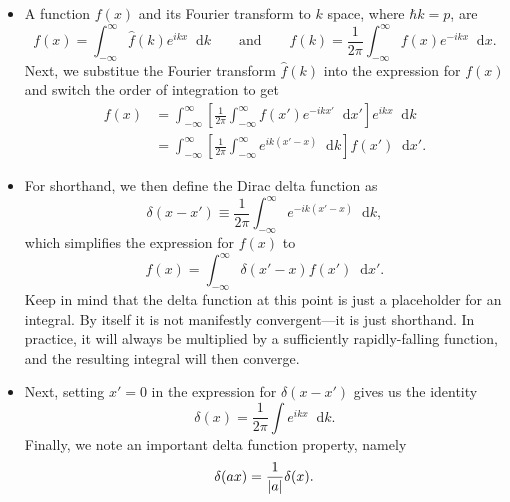 \documentclass[11pt, a4paper]{article}
\newcommand{\diff}{\mathop{}\!\mathrm{d}} %
\newcommand{\F}[1]{\widehat{#1}} %
\begin{document}
\begin{itemize}
    \item A function $ f(x) $ and its Fourier transform to $ k $ space, where $ \hbar k = p $, are
    \begin{equation*}
        f(x) = \int_{-\infty}^{\infty} \F{f}(k) e^{ikx} \diff k \qquad \text{and} \qquad  \F{f}(k) = \frac{1}{2\pi} \int_{-\infty}^{\infty} f(x) e^{-i k x} \diff x.
    \end{equation*}
    Next, we substitue the Fourier transform $ \F{f}(k) $ into the expression for $ f(x) $ and switch the order of integration to get
    \begin{align*}
        f(x) &= \int_{-\infty}^{\infty} \left[ \frac{1}{2\pi} \int_{-\infty}^{\infty} f(x') e^{-ikx'} \diff x' \right] e^{ikx}\diff k \\
        & = \int_{-\infty}^{\infty} \left[ \frac{1}{2\pi} \int_{-\infty}^{\infty} e^{ik(x' - x)}\diff k \right] f(x')\diff x'.
    \end{align*}

    \item For shorthand, we then define the Dirac delta function as
    \begin{equation*}
        \delta(x - x') \equiv \frac{1}{2\pi} \int_{-\infty}^{\infty} e^{-ik(x' - x)} \diff k,
    \end{equation*}
    which simplifies the expression for $ f(x) $ to
    \begin{equation*}
        f(x) = \int_{-\infty}^{\infty} \delta(x' - x)f(x')\diff x'.
    \end{equation*}
    Keep in mind that the delta function at this point is just a placeholder for an integral. By itself it is not manifestly convergent---it is just shorthand. In practice, it will always be multiplied by a sufficiently rapidly-falling function, and the resulting integral will then converge.
    
    \item Next, setting $ x' = 0 $ in the expression for $ \delta(x - x') $ gives us the identity
    \begin{equation*}
        \delta(x) = \frac{1}{2\pi} \int e^{ikx}\diff k.
    \end{equation*}
    Finally, we note an important delta function property, namely
    \begin{equation*}
        \delta(ax) = \frac{1}{\abs{a}} \delta(x).
    \end{equation*}

\end{itemize}
\end{document}
